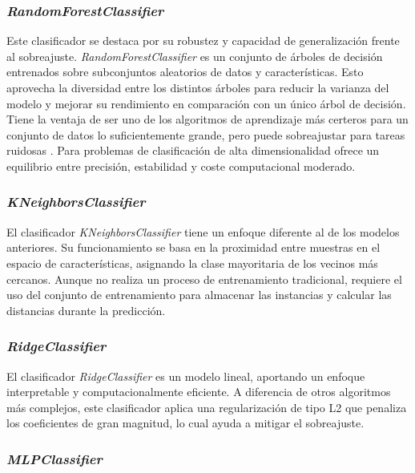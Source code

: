 \subsubsection{\textit{RandomForestClassifier}}
\label{subsubsec:tandomforestclassifier}

Este clasificador se destaca por su robustez y capacidad de generalización frente al sobreajuste. \textit{RandomForestClassifier} es un conjunto de árboles de decisión entrenados sobre subconjuntos aleatorios de datos y características. Esto aprovecha la diversidad entre los distintos árboles para reducir la varianza del modelo y mejorar su rendimiento en comparación con un único árbol de decisión. Tiene la ventaja de ser uno de los algoritmos de aprendizaje más certeros para un conjunto de datos lo suficientemente grande, pero puede sobreajustar para tareas ruidosas \cite{rf}. Para problemas de clasificación de alta dimensionalidad ofrece un equilibrio entre precisión, estabilidad y coste computacional moderado.

\subsubsection{\textit{KNeighborsClassifier}}
\label{subsubsec:kneighborsclassifier}

El clasificador \textit{KNeighborsClassifier} tiene un enfoque diferente al de los modelos anteriores. Su funcionamiento se basa en la proximidad entre muestras en el espacio de características, asignando la clase mayoritaria de los vecinos más cercanos. Aunque no realiza un proceso de entrenamiento tradicional, requiere el uso del conjunto de entrenamiento para almacenar las instancias y calcular las distancias durante la predicción.

\subsubsection{\textit{RidgeClassifier}}
\label{subsubsec:ridgeclassifier}

El clasificador \textit{RidgeClassifier} es un modelo lineal, aportando un enfoque interpretable y computacionalmente eficiente. A diferencia de otros algoritmos más complejos, este clasificador aplica una regularización de tipo L2 que penaliza los coeficientes de gran magnitud, lo cual ayuda a mitigar el sobreajuste.

\subsubsection{\textit{MLPClassifier}}
\label{subsubsec:mlpclassifier}

